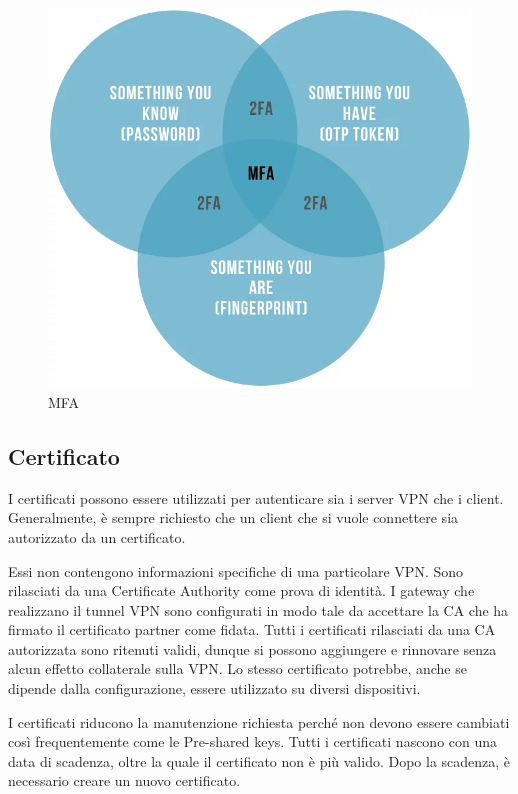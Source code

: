 \begin{figure}[ht]
    \centering
    \includegraphics[width=12cm]{figure/mfa.jpeg}
    \caption{MFA}
\end{figure}

\subsection{Certificato}

I certificati possono essere utilizzati per autenticare sia i server VPN che i client. Generalmente, è sempre richiesto che un client che si vuole connettere sia autorizzato da un certificato.

Essi non contengono informazioni specifiche di una particolare VPN. Sono rilasciati da una Certificate Authority come prova di identità. I gateway che realizzano il tunnel VPN sono configurati in modo tale da accettare la CA che ha firmato il certificato partner come fidata. Tutti i certificati rilasciati da una CA autorizzata sono ritenuti validi, dunque si possono aggiungere e rinnovare senza alcun effetto collaterale sulla VPN. Lo stesso certificato potrebbe, anche se dipende dalla configurazione, essere utilizzato su diversi dispositivi.

I certificati riducono la manutenzione richiesta perché non devono essere cambiati così frequentemente come le Pre-shared keys. Tutti i certificati nascono con una data di scadenza, oltre la quale il certificato non è più valido. Dopo la scadenza, è necessario creare un nuovo certificato.

